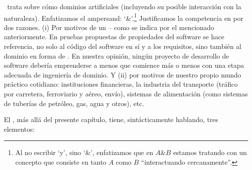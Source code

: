 \begynd
\pind  {} \manual\ trata sobre cómo  dominios artificiales
      (incluyendo su posible interacción con la naturaleza).
      \pind Enfatizamos el ampersand: `\&'.\footnote{Al no escribir `y', sino `\&', enfatizamos que en
      ${A\&B}$ estamos tratando con un  concepto que consiste en
      tanto $A$ como $B$ ``interactuando cercanamente''.}
\pind Justificamos la competencia en 
      por dos razones.
\begynd
\pind (i) Por motivos de un  -- como se indica por el  mencionado anteriormente. En  %
      pruebas propuestas de propiedades del software se hace referencia, no
      solo al código del software en sí y a los requisitos, sino también
      al dominio en forma de . En nuestra opinión, ningún proyecto de desarrollo de software debería
      emprenderse a menos que comience más o menos con una etapa adecuada de ingeniería
      de dominio. Y
\pind (ii) por motivos de  nuestro propio
      mundo práctico cotidiano: instituciones financieras, la industria del transporte
      (tráfico por carretera, ferroviario y aéreo, envío), sistemas de alimentación
      (como sistemas de tuberías de petróleo, gas, agua y otros), etc.
\afslut
\afslut


\label{sec:Structure}

\begynd
\pind El \manual, más allá del presente capítulo, tiene, sintácticamente
hablando, tres elementos:
\afslut

